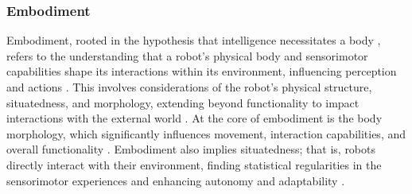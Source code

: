 \subsubsection{Embodiment}
Embodiment, rooted in the hypothesis that intelligence necessitates a body \cite{Pfeifer2006Howbodyshapes,Der2014RoleEmbodimentSelf}, refers to the understanding that a robot's physical body and sensorimotor capabilities shape its interactions within its environment, influencing perception and actions \cite{Duffy2000Intelligentrobotsquestion,Lara2018EmbodiedCognitiveRobotics}. This involves considerations of the robot's physical structure, situatedness, and morphology, extending beyond functionality to impact interactions with the external world \cite{Miller2018EmbodimentSituatednessMorphology}. At the core of embodiment is the body morphology, which significantly influences movement, interaction capabilities, and overall functionality \cite{Pfeifer2006MorphologicalComputationConnecting}. Embodiment also implies situatedness; that is, robots directly interact with their environment, finding statistical regularities in the sensorimotor experiences \cite{Pezzulo2013ComputationalGroundedCognition} and enhancing autonomy and adaptability \cite{Brooks1991NewApproachesRobotics}. 



%


